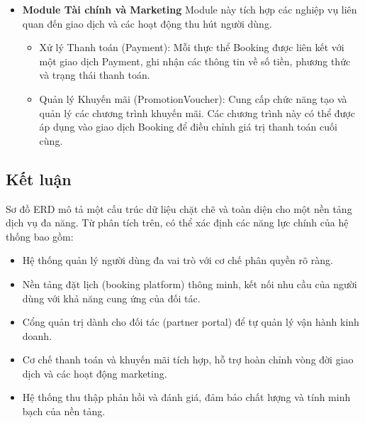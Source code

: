 \begin{itemize}
\begin{itemize}
                \item Đặt lịch (Booking): Là nghiệp vụ cốt lõi, liên kết các thực thể chính: User, Partner, Service, và Employee (của Partner) tại một thời điểm cụ thể. Trạng thái của lịch hẹn (ví dụ: chờ xác nhận, đã hoàn thành, đã hủy) cũng được quản lý tại đây.
            \item Tìm kiếm và Khám phá: Cấu trúc dữ liệu cho phép người dùng truy vấn, lọc và tìm kiếm dịch vụ/đối tác dựa trên nhiều tiêu chí.
            \item Phản hồi và Đánh giá (Feedback/Review): Sau khi sử dụng dịch vụ, người dùng có thể cung cấp phản hồi, giúp xây dựng độ tin cậy và là cơ sở để đánh giá chất lượng đối tác. 
            \end{itemize}
        \item \textbf{Module Tài chính và Marketing}
        Module này tích hợp các nghiệp vụ liên quan đến giao dịch và các hoạt động thu hút người dùng.
            \begin{itemize}
                \item Xử lý Thanh toán (Payment): Mỗi thực thể Booking được liên kết với một giao dịch Payment, ghi nhận các thông tin về số tiền, phương thức và trạng thái thanh toán.
                \item Quản lý Khuyến mãi (Promotion\(\)Voucher): Cung cấp chức năng tạo và quản lý các chương trình khuyến mãi. Các chương trình này có thể được áp dụng vào giao dịch Booking để điều chỉnh giá trị thanh toán cuối cùng.
            \end{itemize}
        \end{itemize}
\subsection{Kết luận}
Sơ đồ ERD mô tả một cấu trúc dữ liệu chặt chẽ và toàn diện cho một nền tảng dịch vụ đa năng. Từ phân tích trên, có thể xác định các năng lực chính của hệ thống bao gồm:
    \begin{itemize}
        \item Hệ thống quản lý người dùng đa vai trò với cơ chế phân quyền rõ ràng.
        \item Nền tảng đặt lịch (booking platform) thông minh, kết nối nhu cầu của người dùng với khả năng cung ứng của đối tác.
        \item Cổng quản trị dành cho đối tác (partner portal) để tự quản lý vận hành kinh doanh.
        \item Cơ chế thanh toán và khuyến mãi tích hợp, hỗ trợ hoàn chỉnh vòng đời giao dịch và các hoạt động marketing.
        \item Hệ thống thu thập phản hồi và đánh giá, đảm bảo chất lượng và tính minh bạch của nền tảng.
    \end{itemize}
